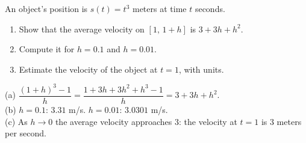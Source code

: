 \begin{exo}{}
An object's position is $s(t)=t^3$ meters at time $t$ seconds.
\begin{enumerate}[label=(\alph*)]
\item Show that the average velocity on $[1,\,1+h]$ is $3+3h+h^2$.
\item Compute it for $h=0.1$ and $h=0.01$.
\item Estimate the velocity of the object at $t=1$, with units.
\end{enumerate}
\begin{solution}
(a) $\dfrac{(1+h)^3-1}{h}=\dfrac{1+3h+3h^2+h^3-1}{h}=3+3h+h^2$.\\
(b) $h=0.1$: $3.31$ m/s. $h=0.01$: $3.0301$ m/s.\\
(c) As $h\to0$ the average velocity approaches $3$: the velocity at $t=1$ is $3$ meters per second.
\end{solution}
\end{exo}

